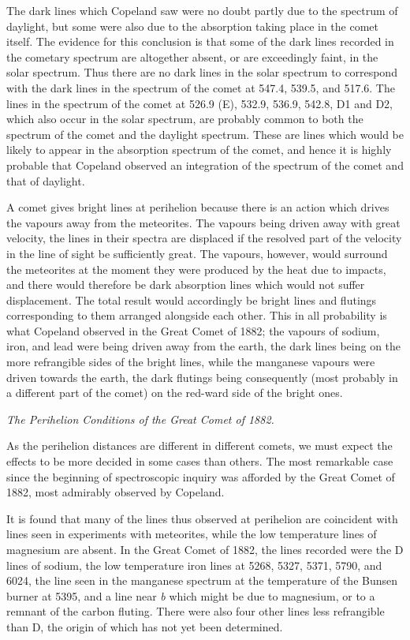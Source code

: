 \documentclass[a4paper, 12pt, oneside, polutonikogreek, english]{article}
\begin{document}
The dark lines which Copeland saw were no doubt partly due to the spectrum of daylight, but some were also due to the absorption taking place in the comet itself. The evidence for this conclusion is that some of the dark lines recorded in the cometary spectrum are altogether absent, or are exceedingly faint, in the solar spectrum. Thus there are no dark lines in the solar spectrum to correspond with the dark lines in the spectrum of the comet at 547.4, 539.5, and 517.6. The lines in the spectrum of the comet at 526.9 (E), 532.9, 536.9, 542.8, D1 and D2, which also occur in the solar spectrum, are probably common to both the spectrum of the comet and the daylight spectrum. These are lines which would be likely to appear in the absorption spectrum of the comet, and hence it is highly probable that Copeland observed an integration of the spectrum of the comet and that of daylight.

A comet gives bright lines at perihelion because there is an action which drives the vapours away from the meteorites. The vapours being driven away with great velocity, the lines in their spectra are displaced if the resolved part of the velocity in the line of sight be sufficiently great. The vapours, however, would surround the meteorites at the moment they were produced by the heat due to impacts, and there would therefore be dark absorption lines which would not suffer displacement. The total result would accordingly be bright lines and flutings corresponding to them arranged alongside each other. This in all probability is what Copeland observed in the Great Comet of 1882; the vapours of sodium, iron, and lead were being driven away from the earth, the dark lines being on the more refrangible sides of the bright lines, while the manganese vapours were driven towards the earth, the dark flutings being consequently (most probably in a different part of the comet) on the red-ward side of the bright ones.

\emph{The Perihelion Conditions of the Great Comet of 1882.}

As the perihelion distances are different in different comets, we must expect the effects to be more decided in some cases than others. The most remarkable case since the beginning of spectroscopic inquiry was afforded by the Great Comet of 1882, most admirably observed by Copeland.

It is found that many of the lines thus observed at perihelion are coincident with lines seen in experiments with meteorites, while the low temperature lines of magnesium are absent. In the Great Comet of 1882, the lines recorded were the D lines of sodium, the low temperature iron lines at 5268, 5327, 5371, 5790, and 6024, the line seen in the manganese spectrum at the temperature of the Bunsen burner at 5395, and a line near \emph{b} which might be due to magnesium, or to a remnant of the carbon fluting. There were also four other lines less refrangible than D, the origin of which has not yet been determined.
\end{document}
